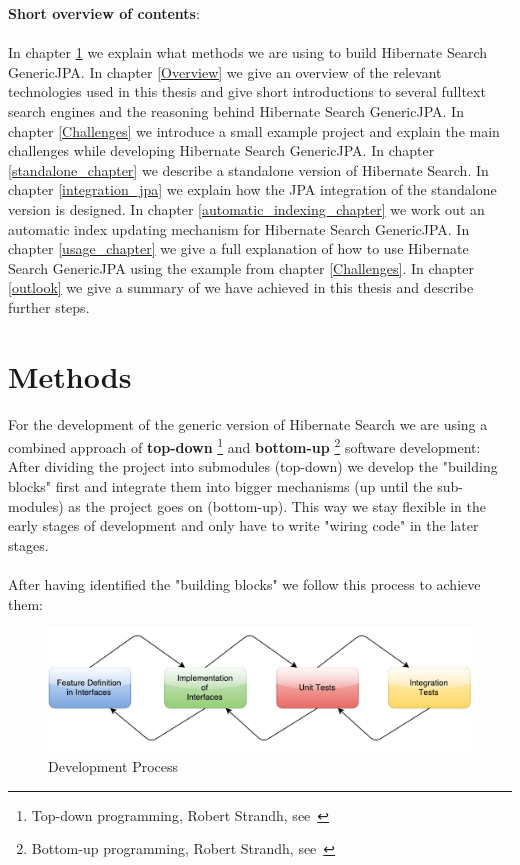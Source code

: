\pagebreak

\noindent
\textbf{Short overview of contents}:
\\\\
\noindent
In chapter \ref{Methods} we explain what methods we are using to build Hibernate Search GenericJPA. In chapter \ref{Overview} we give an overview of the relevant technologies used in this thesis and give short introductions to several fulltext search engines and the reasoning behind Hibernate Search GenericJPA. In chapter \ref{Challenges} we introduce a small example project and explain the main challenges while developing Hibernate Search GenericJPA. In chapter \ref{standalone_chapter} we describe a standalone version of Hibernate Search. In chapter \ref{integration_jpa} we explain how the JPA integration of the standalone version is designed. In chapter \ref{automatic_indexing_chapter} we work out an automatic index updating mechanism for Hibernate Search GenericJPA. In chapter \ref{usage_chapter} we give a full explanation of how to use Hibernate Search GenericJPA using the example from chapter \ref{Challenges}. In chapter \ref{outlook} we give a summary of we have achieved in this thesis and describe further steps.

\pagebreak

\pagebreak

\section{Methods} \label{Methods}

For the development of the generic version of Hibernate Search we are using a combined approach of \textbf{top-down} \footnote{Top-down programming, Robert Strandh, see~\cite{top_down_strandh}} and \textbf{bottom-up} \footnote{Bottom-up programming, Robert Strandh, see~\cite{bottom_up_strandh}} software development: After dividing the project into submodules (top-down) we develop the "building blocks"  first and integrate them into bigger mechanisms (up until the sub-modules) as the project goes on (bottom-up). This way we stay flexible in the early stages of development and only have to write "wiring code" in the later stages.
\\\\
After having identified the "building blocks" we follow this process to achieve them:

\begin{figure}[ht]
	\centering
	\includegraphics[scale=0.52]{images/work_process.pdf}
	\caption{Development Process}
	\label{development_process_of_a_feature}
\end{figure}

